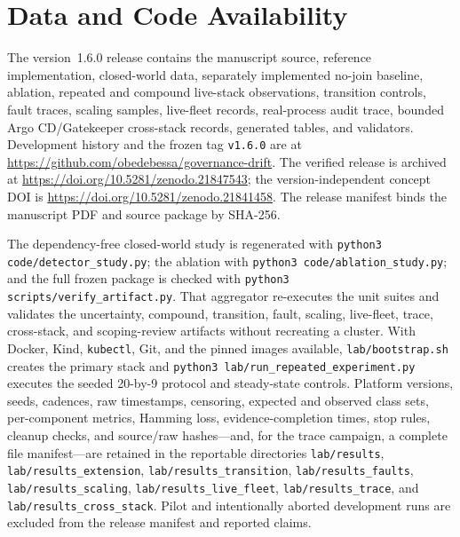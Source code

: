 \section{Data and Code Availability}
\label{sec:availability}

The version~1.6.0 release contains the manuscript source, reference
implementation, closed-world data, separately implemented no-join baseline,
ablation, repeated and compound live-stack observations, transition controls,
fault traces, scaling samples, live-fleet records, real-process audit trace,
bounded Argo CD/Gatekeeper cross-stack records, generated tables, and
validators. Development history and the frozen tag \texttt{v1.6.0} are at
\url{https://github.com/obedebessa/governance-drift}. The verified release is
archived at \url{https://doi.org/10.5281/zenodo.21847543}; the
version-independent concept DOI is
\url{https://doi.org/10.5281/zenodo.21841458}. The release manifest binds the
manuscript PDF and source package by SHA-256.

The dependency-free closed-world study is regenerated with
\texttt{python3 code/detector\_study.py};
the ablation with \texttt{python3 code/ablation\_study.py}; and the full
frozen package is checked with
\texttt{python3 scripts/verify\_artifact.py}. That aggregator re-executes the
unit suites and validates the uncertainty, compound, transition, fault,
scaling, live-fleet, trace, cross-stack, and scoping-review artifacts without recreating a
cluster. With Docker, Kind, \texttt{kubectl}, Git, and the pinned images
available, \texttt{lab/bootstrap.sh} creates the primary stack and
\texttt{python3 lab/run\_repeated\_experiment.py} executes the seeded
20-by-9 protocol and steady-state controls. Platform versions, seeds,
cadences, raw timestamps, censoring, expected and observed class sets,
per-component metrics, Hamming loss, evidence-completion times, stop rules,
cleanup checks, and source/raw hashes---and, for the trace campaign, a complete
file manifest---are retained in the reportable directories
\texttt{lab/results}, \texttt{lab/results\_extension},
\texttt{lab/results\_transition}, \texttt{lab/results\_faults},
\texttt{lab/results\_scaling}, \texttt{lab/results\_live\_fleet},
\texttt{lab/results\_trace}, and \texttt{lab/results\_cross\_stack}. Pilot and
intentionally aborted development runs
are excluded from the release manifest and reported claims.
